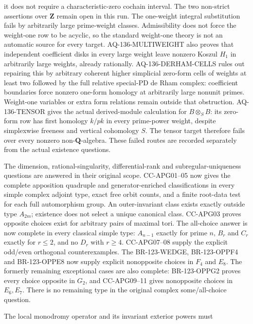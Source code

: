 \documentclass[11pt,a4paper]{article}
\theoremstyle{definition}\newtheorem{definition}[theorem]{Definition}
\theoremstyle{remark}\newtheorem{remark}[theorem]{Remark}
\begin{document}
\begin{description}[style=nextline,leftmargin=0pt,labelwidth=0pt,labelsep=0pt]
it does not require a characteristic-zero cochain interval.
The two non-strict assertions over $\mathbf Z$ remain open in this
run. The one-weight integral substitution fails by arbitrarily large
prime-weight classes. Admissibility does not force the weight-one
row to be acyclic, so the standard weight-one theory is not an
automatic source for every target. AQ-136-MULTIWEIGHT also proves
that independent coefficient disks in every large weight leave nonzero
Koszul $H_1$ in arbitrarily large weights, already rationally.
AQ-136-DERHAM-CELLS rules out repairing this by arbitrary coherent
higher simplicial zero-form cells of weights at least two followed
by the full relative special-PD de Rham complex: coefficient
boundaries force nonzero one-form homology at arbitrarily large
nonunit primes. Weight-one variables or extra form relations
remain outside that obstruction.
AQ-136-TENSOR gives the actual derived-module calculation for
$B\otimes_S B$: its zero-form row has first homology $k/pk$
in every prime-power weight, despite simplexwise freeness and vertical
cohomology $S$. The tensor target therefore fails over every nonzero
non-$\mathbf Q$-algebra. These failed routes are recorded
separately from the actual existence questions.
\item[Cote 123: the original apposition questions are now closed.]
The dimension, rational-singularity, differential-rank and
subregular-uniqueness questions are answered in their original scope.
CC-APG01--05 now gives the complete apposition quadruple and
generator-enriched classifications in every simple complex adjoint
type, exact free orbit counts, and a finite root-data test for each
full automorphism group. An outer-invariant class exists exactly
outside type $A_{2m}$; existence does not select a unique canonical
class. CC-APG03 proves opposite choices exist for arbitrary pairs of
maximal tori. The all-choice answer is now complete in every classical simple
type: $A_{n-1}$ exactly for prime $n$, $B_r$ and $C_r$ exactly
for $r\leq2$, and no $D_r$ with $r\geq4$. CC-APG07--08
supply the explicit odd/even orthogonal counterexamples. The
BR-123-WEDGE, BR-123-OPPF4 and BR-123-OPPE8 now supply
explicit nonopposite choices in $F_4$ and $E_8$.  The formerly remaining
exceptional cases are also complete: BR-123-OPPG2 proves every
choice opposite in $G_2$, and CC-APG09--11 gives nonopposite
choices in $E_6,E_7$. There is no remaining type in the original
complex some/all-choice question.
\item[Weight--monodromy and universal-curve categories.]
The local monodromy operator and its invariant exterior powers must

\end{description}
\end{document}
